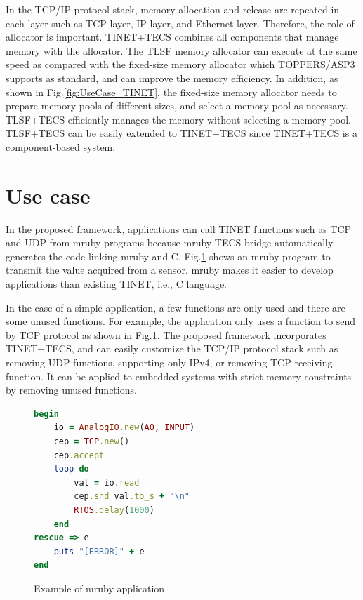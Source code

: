 \documentclass[a4j,12pt,oneside,openany,english]{jsbook}
\begin{document}
In the TCP/IP protocol stack, memory allocation and release are repeated in each layer such as TCP layer, IP layer, and Ethernet layer.
Therefore, the role of allocator is important.
TINET+TECS combines all components that manage memory with the allocator.
The TLSF memory allocator can execute at the same speed as compared with the fixed-size memory allocator which TOPPERS/ASP3 supports as standard, and can improve the memory efficiency.
In addition, as shown in Fig.\ref{fig:UseCase_TINET}, the fixed-size memory allocator needs to prepare memory pools of different sizes, and select a memory pool as necessary.
TLSF+TECS efficiently manages the memory without selecting a memory pool.
TLSF+TECS can be easily extended to TINET+TECS since TINET+TECS is a component-based system.


\section{Use case}
\label{sec:UseCase}

In the proposed framework, applications can call TINET functions such as TCP and UDP from mruby programs because mruby-TECS bridge automatically generates the code linking mruby and C.
Fig.\ref{src:mruby} shows an mruby program to transmit the value acquired from a sensor.
mruby makes it easier to develop applications than existing TINET, i.e., C language.

In the case of a simple application, a few functions are only used and there are some unused functions.
For example, the application only uses a function to send by TCP protocol as shown in Fig.\ref{src:mruby}.
The proposed framework incorporates TINET+TECS, and can easily customize the TCP/IP protocol stack such as removing UDP functions, supporting only IPv4, or removing TCP receiving function.
It can be applied to embedded systems with strict memory constraints by removing unused functions.


\begin{figure}[t]
\centering
\begin{lstlisting}[language=Ruby]
begin
    io = AnalogIO.new(A0, INPUT)
    cep = TCP.new()	
    cep.accept
    loop do		
        val = io.read  
        cep.snd val.to_s + "\n"		
        RTOS.delay(1000)			
    end
rescue => e	
    puts "[ERROR]" + e
end
\end{lstlisting}
\caption{Example of mruby application}
\label{src:mruby}
\end{figure}
\end{document}
